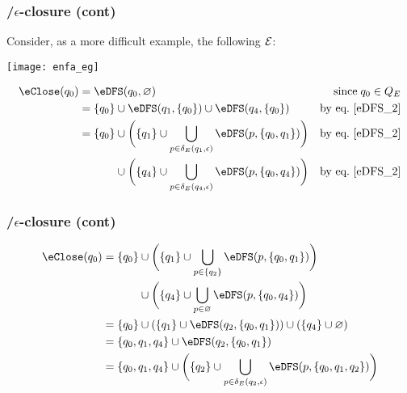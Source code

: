 % 
\begin{frame}
\frametitle{\eNFA{}/\(\epsilon\)-closure (cont)}

Consider, as a more difficult example, the following \eNFA \(\cal E\):
\vspace*{-3pt}
\begin{center}
\texttt{[image: enfa\_eg]}
\end{center}
\vspace*{-8pt}
\begin{align*}
\eClose (q_0) 
  &= \eDFS (q_0, \varnothing) 
  & \text{since} \; q_0 \in Q_E\\
  & = \{q_0\} \cup \eDFS (q_1, \{q_0\}) 
              \cup \eDFS (q_4, \{q_0\})
  & \text{by eq.~\ref{eDFS_2}}\\
  &= \{q_0\} \cup \biggl( \{q_1\} \cup \bigcup_{p \in
                \delta_E(q_1,\epsilon)}{\eDFS (p, \{q_0,
                q_1\})}\biggr)
  & \text{by eq.~\ref{eDFS_2}}\\
  &\mathrel{\phantom{=}} \phantom{\{q_0\}}{} 
   \cup \biggl( \{q_4\} \cup \bigcup_{p \in
     \delta_E(q_4,\epsilon)}{\eDFS (p, \{q_0, q_4\})}
   \biggr)
  & \text{by eq.~\ref{eDFS_2}}
\end{align*}

\end{frame}

% 
\begin{frame}
\frametitle{\eNFA{}/\(\epsilon\)-closure (cont)}

\begin{align*}
\eClose (q_0)
  &= \{q_0\} \cup \biggl( \{q_1\} \cup \bigcup_{p \in
                \{q_2\}}{\eDFS (p, \{q_0, q_1\})}\biggr)\\
  &\mathrel{\phantom{=}} \phantom{\{q_0\}}{} 
   \cup \biggl( \{q_4\} \cup \bigcup_{p \in \varnothing}{\eDFS (p,
     \{q_0, q_4\})} \biggr)\\
  &= \{q_0\} \cup (\{q_1\} \cup \eDFS (q_2, \{q_0, q_1\}))
     \cup (\{q_4\} \cup \varnothing)\\
  &= \{q_0, q_1, q_4\} \cup \eDFS (q_2, \{q_0, q_1\})\\
  &= \{q_0, q_1, q_4\} \cup \biggl(\{q_2\} \cup \bigcup_{p \in
       \delta_E(q_2,\epsilon)}{\eDFS (p, \{q_0, q_1,
       q_2\})}\biggr)
\end{align*}

\end{frame}

